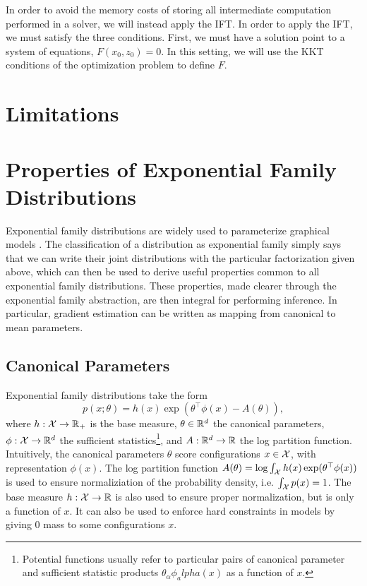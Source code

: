 \documentclass[11pt]{article}
\begin{document}
In order to avoid the memory costs of storing all intermediate computation performed
in a solver, we will instead apply the IFT.
In order to apply the IFT, we must satisfy the three conditions.
First, we must have a solution point to a system of equations, $F(x_0, z_0) = 0$.
In this setting, we will use the KKT conditions of the optimization problem to define $F$.

\section{Limitations}



\appendix

\section{Properties of Exponential Family Distributions}
\label{sec:exp-fam}
Exponential family distributions are widely used to parameterize graphical models \citep{vi}.
The classification of a distribution as exponential family simply says that we can write
their joint distributions with the particular factorization given above,
which can then be used to derive useful properties common to all exponential
family distributions.
These properties, made clearer through the exponential family abstraction,
are then integral for performing inference.
In particular, gradient estimation can be written as mapping from
canonical to mean parameters.

\subsection{Canonical Parameters}
Exponential family distributions take the form
\begin{equation}
    \label{eqn:exp-canon}
    p(x;\theta) = h(x)\exp(\theta^\top \phi(x)-A(\theta)),
\end{equation}
where $h:\mathcal{X}\to\mathbb{R}_+$ is the base measure,
$\theta\in\mathbb{R}^d$ the canonical parameters,
$\phi:\mathcal{X}\to\mathbb{R}^d$ the sufficient statistics\footnote{Potential functions usually refer to
particular pairs of canonical parameter and sufficient statistic products
$\theta_\alpha\phi_alpha(x)$ as a function of $x$.},
and $A:\mathbb{R}^d\to\mathbb{R}$ the log partition function.
Intuitively, the canonical parameters $\theta$ score configurations $x\in\mathcal{X}$,
with representation $\phi(x)$.
The log partition function $A(\theta) = \log\int_{\mathcal{X}}h(x)\exp(\theta^\top\phi(x))$
is used to ensure normaliziation of the probability density,
i.e. $\int_{\mathcal{X}}p(x) = 1$.
The base measure $h:\mathcal{X}\to\mathbb{R}$ is also used to ensure proper normalization,
but is only a function of $x$.
It can also be used to enforce hard constraints in models by giving
0 mass to some configurations $x$.
\end{document}

